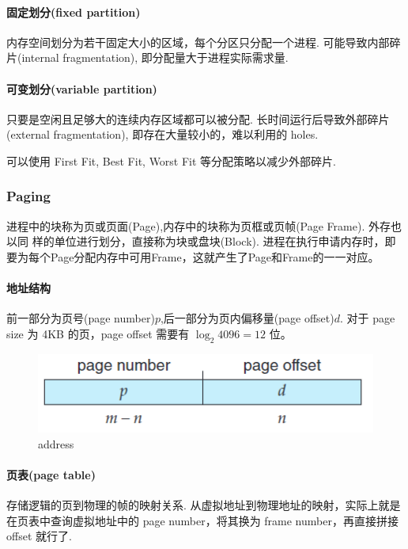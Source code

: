 \paragraph{固定划分(fixed partition)}内存空间划分为若干固定大小的区域，每个分区只分配一个进程. 可能导致内部碎片(internal fragmentation), 即分配量大于进程实际需求量. 

\paragraph{可变划分(variable partition)}只要是空闲且足够大的连续内存区域都可以被分配. 长时间运行后导致外部碎片(external fragmentation), 即存在大量较小的，难以利用的 holes. 

可以使用 First Fit, Best Fit, Worst Fit 等分配策略以减少外部碎片. 

\subsubsection{Paging}
进程中的块称为页或页面(Page),内存中的块称为页框或页帧(Page Frame). 外存也以同
样的单位进行划分，直接称为块或盘块(Block). 进程在执行申请内存时，即要为每个Page分配内存中可用Frame，这就产生了Page和Frame的一一对应。

\paragraph{地址结构}前一部分为页号(page number)$p$,后一部分为页内偏移量(page offset)$d$. 对于 page size 为 4KB 的页，page offset 需要有 $\log_2 4096=12$ 位。

\begin{figure}[H]
    \centering
    \includegraphics[width=0.618\linewidth]{pic/OS8/address}
    \caption{address}
\end{figure}


\paragraph{页表(page table)}存储逻辑的页到物理的帧的映射关系. 从虚拟地址到物理地址的映射，实际上就是在页表中查询虚拟地址中的 page number，将其换为 frame number，再直接拼接 offset 就行了. 


